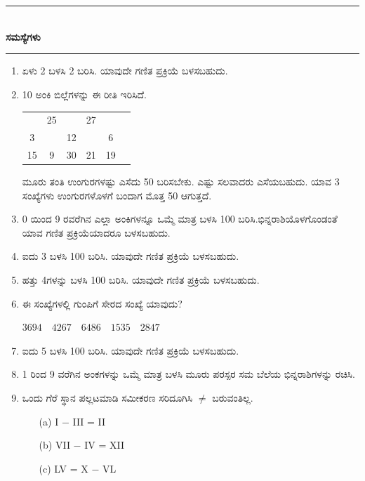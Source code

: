 \chapter[ಅಧ್ಯಾಯ 9]{}\label{chap9}

\begin{center}
\rule{5cm}{1pt}\\[5pt]
{\Large\bfseries ಸಮಸ್ಯೆಗಳು}\\[3pt]
\rule{5cm}{1pt}
\end{center}

\begin{enumerate}
\renewcommand{\labelenumi}{\bf\theenumi.}
\itemsep=5pt
\item ಏಳು 2 ಬಳಸಿ 2 ಬರಿಸಿ. ಯಾವುದೇ ಗಣಿತ ಪ್ರಕ್ರಿಯೆ ಬಳಸಬಹುದು. 

\item 10 ಅಂಕಿ ಬಿಲ್ಲೆಗಳನ್ನು ಈ ರೀತಿ ಇರಿಸಿದೆ. 

\begin{tabular}[t]{c@{\;}c@{\;}c@{\;}c@{\;}c@{\;}c}
& 25 & & 27 & & \\
3 & & 12 & & 6 & \\
15 & 9 & 30 & 21 & 19
\end{tabular}

ಮೂರು ತಂತಿ ಉಂಗುರಗಳಷ್ಟು ಎಸೆದು 50 ಬರಿಸಬೇಕು. ಎಷ್ಟು ಸಲವಾದರು ಎಸೆಯಬಹುದು. ಯಾವ 3 ಸಂಖ್ಯೆಗಳು ಉಂಗುರಗಳೊಳಗೆ ಬಂದಾಗ ಮೊತ್ತ 50 ಆಗುತ್ತದೆ. 

\item 0 ಯಿಂದ 9 ರವರೆಗಿನ ಎಲ್ಲಾ ಅಂಕಿಗಳನ್ನೂ ಒಮ್ಮೆ ಮಾತ್ರ ಬಳಸಿ 100 ಬರಿಸಿ.\break ಭಿನ್ನರಾಶಿಯೊಳಗೊಂಡಂತೆ ಯಾವ ಗಣಿತ ಪ್ರಕ್ರಿಯೆಯಾದರೂ ಬಳಸಬಹುದು. 

\item ಐದು 3 ಬಳಸಿ 100 ಬರಿಸಿ. ಯಾವುದೇ ಗಣಿತ ಪ್ರಕ್ರಿಯೆ ಬಳಸಬಹುದು. 

\item ಹತ್ತು 4ಗಳನ್ನು ಬಳಸಿ 100 ಬರಿಸಿ. ಯಾವುದೇ ಗಣಿತ ಪ್ರಕ್ರಿಯೆ ಬಳಸಬಹುದು. 

\item ಈ ಸಂಖ್ಯೆಗಳಲ್ಲಿ ಗುಂಪಿಗೆ ಸೇರದ ಸಂಖ್ಯೆ ಯಾವುದು? 

\medskip

$3694 \quad  4267 \quad   6486 \quad  1535 \quad  2847$

\item ಐದು 5 ಬಳಸಿ 100 ಬರಿಸಿ. ಯಾವುದೇ ಗಣಿತ ಪ್ರಕ್ರಿಯೆ ಬಳಸಬಹುದು. 

\eject 

\item 1 ರಿಂದ 9 ವರೆಗಿನ ಅಂಕಗಳನ್ನು ಒಮ್ಮೆ ಮಾತ್ರ ಬಳಸಿ ಮೂರು ಪರಸ್ಪರ ಸಮ ಬೆಲೆಯ ಭಿನ್ನರಾಶಿಗಳನ್ನು ರಚಿಸಿ. 

\item ಒಂದು ಗೆರೆ ಸ್ಥಾನ ಪಲ್ಲಟಮಾಡಿ ಸಮೀಕರಣ ಸರಿದೂಗಿಸಿ $\neq$ ಬರುವಂತಿಲ್ಲ. 
\begin{itemize}
\item[(a)] I $-$ III = II
\item[(b)] VII $-$ IV = XII
\item[(c)] LV = X $-$ VL
\end{itemize}


\end{enumerate}
